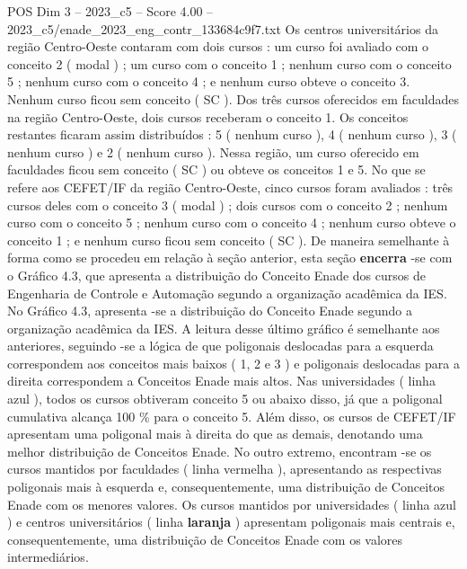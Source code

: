 \begin{textsample}{POS Dim 3 – 2023\_c5 – Score 4.00 – 2023\_c5/enade\_2023\_eng\_contr\_133684c9f7.txt}
Os centros universitários da região Centro-Oeste contaram com dois cursos : um curso foi avaliado com o conceito 2 ( modal ) ; um curso com o conceito 1 ; nenhum curso com o conceito 5 ; nenhum curso com o conceito 4 ; e nenhum curso obteve o conceito 3.
Nenhum curso ficou sem conceito ( SC ).
Dos três cursos oferecidos em faculdades na região Centro-Oeste, dois cursos receberam o conceito 1.
Os conceitos restantes ficaram assim distribuídos : 5 ( nenhum curso ), 4 ( nenhum curso ), 3 ( nenhum curso ) e 2 ( nenhum curso ).
Nessa região, um curso oferecido em faculdades ficou sem conceito ( SC ) ou obteve os conceitos 1 e 5.
No que se refere aos CEFET/IF da região Centro-Oeste, cinco cursos foram avaliados : três cursos deles com o conceito 3 ( modal ) ; dois cursos com o conceito 2 ; nenhum curso com o conceito 5 ; nenhum curso com o conceito 4 ; nenhum curso obteve o conceito 1 ; e nenhum curso ficou sem conceito ( SC ).
De maneira semelhante à forma como se procedeu em relação à seção anterior, esta seção \textbf{encerra} -se com o Gráfico 4.3, que apresenta a distribuição do Conceito Enade dos cursos de Engenharia de Controle e Automação segundo a organização acadêmica da IES.
No Gráfico 4.3, apresenta -se a distribuição do Conceito Enade segundo a organização acadêmica da IES.
A leitura desse último gráfico é semelhante aos anteriores, seguindo -se a lógica de que poligonais deslocadas para a esquerda correspondem aos conceitos mais baixos ( 1, 2 e 3 ) e poligonais deslocadas para a direita correspondem a Conceitos Enade mais altos.
Nas universidades ( linha azul ), todos os cursos obtiveram conceito 5 ou abaixo disso, já que a poligonal cumulativa alcança 100 \% para o conceito 5.
Além disso, os cursos de CEFET/IF apresentam uma poligonal mais à direita do que as demais, denotando uma melhor distribuição de Conceitos Enade.
No outro extremo, encontram -se os cursos mantidos por faculdades ( linha vermelha ), apresentando as respectivas poligonais mais à esquerda e, consequentemente, uma distribuição de Conceitos Enade com os menores valores.
Os cursos mantidos por universidades ( linha azul ) e centros universitários ( linha \textbf{laranja} ) apresentam poligonais mais centrais e, consequentemente, uma distribuição de Conceitos Enade com os valores intermediários.

\end{textsample}
